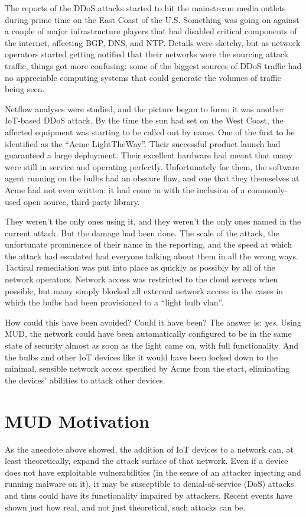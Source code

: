 \documentclass[conference]{IEEEtran}
\begin{document}
The reports of the DDoS attacks started to hit the mainstream media
outlets during prime time on the East Coast of the U.S.  Something was
going on against a couple of major infrastructure players that had
disabled critical components of the internet, affecting BGP, DNS, and
NTP.  Details were sketchy, but as network operators started getting
notified that their networks were the sourcing attack traffic, things
got more confusing: some of the biggest sources of DDoS traffic had no
appreciable computing systems that could generate the volumes of
traffic being seen.

Netflow analyses were studied, and the picture began to form: it was
another IoT-based DDoS attack.  By the time the sun had set on the
West Coast, the affected equipment was starting to be called out by
name.  One of the first to be identified as the ``Acme LightTheWay''.
Their successful product launch had guaranteed a large deployment.
Their excellent hardware had meant that many were still in service and
operating perfectly.  Unfortunately for them, the software agent
running on the bulbs had an obscure flaw, and one that they themselves
at Acme had not even written: it had come in with the inclusion of a
commonly-used open source, third-party library.

They weren't the only ones using it, and they weren't the only ones
named in the current attack.  But the damage had been done.  The scale
of the attack, the unfortunate prominence of their name in the
reporting, and the speed at which the attack had escalated had
everyone talking about them in all the wrong ways.  Tactical
remediation was put into place as quickly as possibly by all of the
network operators.  Network access was restricted to the cloud servers
when possible, but many simply blocked all external network access in
the cases in which the bulbs had been provisioned to a ``light bulb
vlan''.

How could this have been avoided?  Could it have been?  The answer is:
{\em yes}.  Using MUD, the network could have been automatically
configured to be in the same state of security almost as soon as the
light came on, with full functionality.  And the bulbs and other IoT
devices like it would have been locked down to the minimal, sensible
network access specified by Acme from the start, eliminating the
devices' abilities to attack other devices.

\section{MUD Motivation}
As the anecdote above showed, the addition of IoT devices to a network
can, at least theoretically, expand the attack surface of that
network.  Even if a device does not have exploitable vulnerabilities
(in the sense of an attacker injecting and running malware on it), it
may be susceptible to denial-of-service (DoS) attacks and thus could
have its functionality impaired by attackers.  Recent events have
shown just how real, and not just theoretical, such attacks can be.
\end{document}
